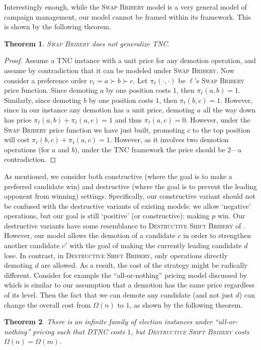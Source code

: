 \documentclass[letterpaper]{article} %
\newtheorem{theorem}{Theorem}
\newcommand{\SB}{\textsc{TNC}}
\newcommand{\DTNC}{\textsc{DTNC}}
\newcommand{\swapB}{\textsc{Swap Bribery}}
\newcommand{\shiftB}{\textsc{Shift Bribery}}
\newcommand{\DshiftB}{\textsc{Destructive} \shiftB{}}
\begin{document}
Interestingly enough, while the \swapB{} model is a very general model of campaign management, our model cannot be framed within its framework. This is shown by the following theorem.
\begin{theorem}
\swapB{} does not generalize \SB.
\end{theorem}
\begin{proof}
Assume a \SB{} instance with a unit price for any demotion operation, and assume by contradiction that it can be modeled under \swapB.
 Now consider a preference order $v_\ell = a \succ b \succ c$. Let $\pi_\ell(\cdot,\cdot)$ be $\ell$'s \swapB{} price function. Since demoting $a$ by one position costs $1$, then $\pi_\ell(a,b)=1$. Similarly, since demoting $b$ by one position costs $1$, then $\pi_\ell(b,c)=1$. However, since in our instance any demotion has a unit price, demoting $a$ all the way down has price $\pi_\ell(a,b)+\pi_\ell(a,c)=1$ and thus $\pi_\ell(a,c)=0$. However, under the \swapB{} price function we have just built, promoting $c$ to the top position will cost $\pi_\ell(b,c)+\pi_\ell(a,c)=1$. However, as it involves two demotion operations (for $a$ and $b$), under the \SB{} framework the price should be $2$---a contradiction.
\end{proof}
As mentioned, we consider both constructive (where the goal is to make a preferred candidate win) and destructive (where the goal is to prevent the leading opponent from winning) settings. Specifically,  our constructive variant should not be confused with the destructive variants of existing models: we allow `negative' operations, but our goal is still `positive' (or constructive): making $p$ win.
Our destructive variants have some resemblance to \DshiftB{} of \citet{Kaczmarczyk2019destructive}. However, our model allows the demotion of a candidate $c$ in order to strengthen another candidate $c'$ with the goal of making the currently leading candidate $d$ lose. In contrast, in \DshiftB, only operations directly demoting $d$ are allowed. As a result, the cost of the strategy might be radically different. Consider for example the ``all-or-nothing'' pricing model discussed by \citet{Kaczmarczyk2019destructive} which is similar to our assumption that a demotion has the same price regardless of its level. Then the fact that we can demote any candidate (and not just $d$) can change the overall cost from $\Omega(n)$ to $1$, as shown by the following theorem.
\begin{theorem} There is an infinite family of election instances under ``all-or-nothing'' pricing   such that \DTNC{} costs $1$, but
\DshiftB{} costs $\Omega(n)=\Omega(m)$.
\end{theorem}
\end{document}
